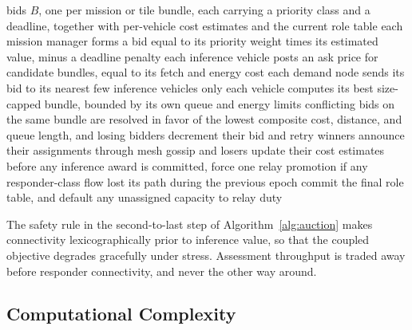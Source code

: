 \documentclass[drones,article,submit,moreauthors]{Definitions/mdpi}
\begin{document}
\begin{algorithm}[H]
\caption{Priority-Auction (run once per placement epoch, fully decentralized)}
\label{alg:auction}
\begin{algorithmic}[1]
\Require bids $B$, one per mission or tile bundle, each carrying a priority class and a deadline, together with per-vehicle cost estimates and the current role table
\State each mission manager forms a bid equal to its priority weight times its estimated value, minus a deadline penalty
\State each inference vehicle posts an ask price for candidate bundles, equal to its fetch and energy cost
    \State each demand node sends its bid to its nearest few inference vehicles only
    \State each vehicle computes its best size-capped bundle, bounded by its own queue and energy limits
    \State conflicting bids on the same bundle are resolved in favor of the lowest composite cost, distance, and queue length, and losing bidders decrement their bid and retry
    \State winners announce their assignments through mesh gossip and losers update their cost estimates
\EndFor
\State before any inference award is committed, force one relay promotion if any responder-class flow lost its path during the previous epoch
\State commit the final role table, and default any unassigned capacity to relay duty
\end{algorithmic}
\end{algorithm}

The safety rule in the second-to-last step of Algorithm~\ref{alg:auction} makes connectivity lexicographically prior to inference value, so that the coupled objective degrades gracefully under stress. Assessment throughput is traded away before responder connectivity, and never the other way around.

\subsection{Computational Complexity}
\end{document}
